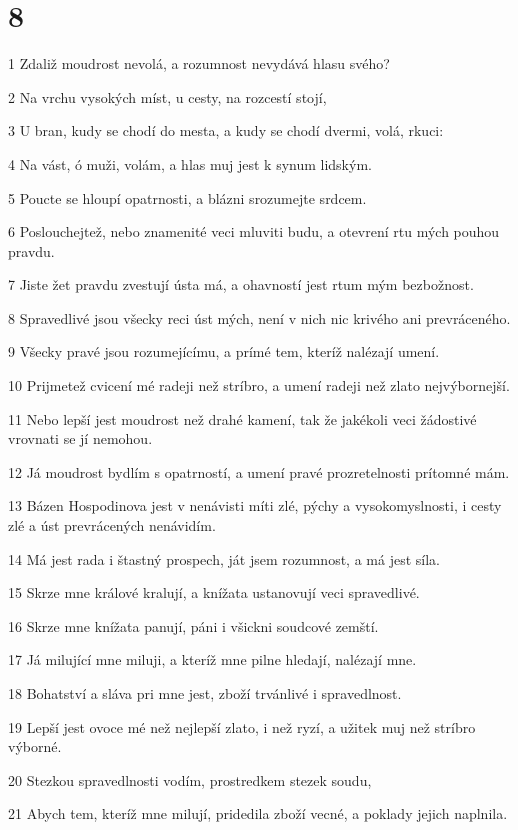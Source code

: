 \chapter{8}

\par 1 Zdaliž moudrost nevolá, a rozumnost nevydává hlasu svého?
\par 2 Na vrchu vysokých míst, u cesty, na rozcestí stojí,
\par 3 U bran, kudy se chodí do mesta, a kudy se chodí dvermi, volá, rkuci:
\par 4 Na vást, ó muži, volám, a hlas muj jest k synum lidským.
\par 5 Poucte se hloupí opatrnosti, a blázni srozumejte srdcem.
\par 6 Poslouchejtež, nebo znamenité veci mluviti budu, a otevrení rtu mých pouhou pravdu.
\par 7 Jiste žet pravdu zvestují ústa má, a ohavností jest rtum mým bezbožnost.
\par 8 Spravedlivé jsou všecky reci úst mých, není v nich nic krivého ani prevráceného.
\par 9 Všecky pravé jsou rozumejícímu, a prímé tem, kteríž nalézají umení.
\par 10 Prijmetež cvicení mé radeji než stríbro, a umení radeji než zlato nejvýbornejší.
\par 11 Nebo lepší jest moudrost než drahé kamení, tak že jakékoli veci žádostivé vrovnati se jí nemohou.
\par 12 Já moudrost bydlím s opatrností, a umení pravé prozretelnosti prítomné mám.
\par 13 Bázen Hospodinova jest v nenávisti míti zlé, pýchy a vysokomyslnosti, i cesty zlé a úst prevrácených nenávidím.
\par 14 Má jest rada i štastný prospech, ját jsem rozumnost, a má jest síla.
\par 15 Skrze mne králové kralují, a knížata ustanovují veci spravedlivé.
\par 16 Skrze mne knížata panují, páni i všickni soudcové zemští.
\par 17 Já milující mne miluji, a kteríž mne pilne hledají, nalézají mne.
\par 18 Bohatství a sláva pri mne jest, zboží trvánlivé i spravedlnost.
\par 19 Lepší jest ovoce mé než nejlepší zlato, i než ryzí, a užitek muj než stríbro výborné.
\par 20 Stezkou spravedlnosti vodím, prostredkem stezek soudu,
\par 21 Abych tem, kteríž mne milují, pridedila zboží vecné, a poklady jejich naplnila.
